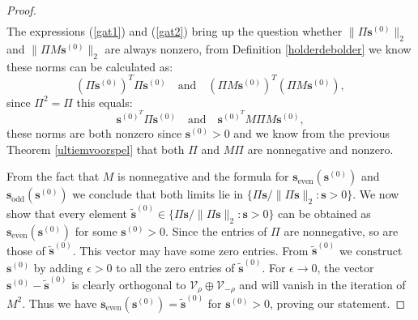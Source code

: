 \documentclass[a4paper,11pt]{report}
\begin{document}
\begin{proof}
\begin{eqnarray}
 \end{eqnarray}
The expressions (\ref{gat1}) and (\ref{gat2}) bring up the question whether $\|\Pi \mathbf{s}^{(0)}\|_2$ and $\|\Pi M \mathbf{s}^{(0)}\|_2$ are 
always 
nonzero, from Definition \ref{holderdebolder} we know these norms can be 
calculated as:
$$(\Pi\mathbf{s}^{(0)})^T \Pi\mathbf{s}^{(0)} \quad \text{and} \quad (\Pi M \mathbf{s}^{(0)})^T (\Pi M \mathbf{s}^{(0)}),$$
since $\Pi^2 = \Pi$ this equals:
$$\mathbf{s}^{(0)}^T \Pi\mathbf{s}^{(0)} \quad \text{and} \quad \mathbf{s}^{(0)}^T M\Pi M \mathbf{s}^{(0)},$$
these norms are both nonzero since $\mathbf{s}^{(0)} > 0$ and 
 we know from the previous Theorem \ref{ultiemvoorspel} that both $\Pi$ and $M\Pi$ are nonnegative and nonzero.
 
 From the fact that $M$ is nonnegative and the formula for $\mathbf{s}_{\text{even}}(\mathbf{s}^{(0)})$ 
 and $\mathbf{s}_{\text{odd}}(\mathbf{s}^{(0)})$ we conclude that both limits lie in 
 $\{\Pi\mathbf{s}/\|\Pi \mathbf{s}\|_2: \mathbf{s}> 0\}$. We now show that every 
 element $\mathbf{\tilde{s}}^{(0)} \in \{\Pi\mathbf{s}/\|\Pi \mathbf{s}\|_2: \mathbf{s}> 0\}$ 
 can be obtained as $\mathbf{s}_{\text{even}}(\mathbf{s}^{(0)})$ for some $\mathbf{s}^{(0)}  
 > 0$. Since the entries of $\Pi$ are nonnegative, so are those of 
 $\mathbf{\tilde{s}}^{(0)}$. This vector may have some zero entries. From $\mathbf{\tilde{s}}^{(0)}$ 
 we construct $\mathbf{s}^{(0)}$ by adding $\epsilon > 0$ to all the zero entries of 
 $\mathbf{\tilde{s}}^{(0)}$. For $\epsilon \to 0$, the vector $\mathbf{s}^{(0)} - \mathbf{\tilde{s}}^{(0)}$ is 
 clearly orthogonal to $\mathcal{V}_\rho \oplus \mathcal{V}_{-\rho}$ and will 
 vanish in the iteration of $M^2$. Thus we have $\mathbf{s}_{\text{even}}(\mathbf{s}^{(0)}) = \mathbf{\tilde{s}}^{(0)}$ 
 for $\mathbf{s}^{(0)} > 0$, proving our statement.
 

\end{proof}
\end{document}
